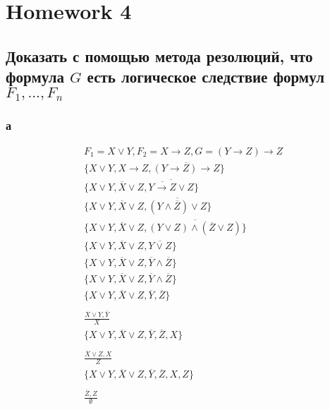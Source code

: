\documentclass[12pt]{article}
\begin{document}
\newpage
\section{Homework 4}

\subsection{Доказать с помощью метода резолюций, что формула $G$ есть логическое следствие формул $F_1,...,F_n$}
\subsubsection{а}
\begin{gather*}
  F_1 = X \vee Y, F_2 = X \rightarrow Z, G = \left( Y \rightarrow Z \right) \rightarrow Z \\
  \{X \vee Y, X \rightarrow Z, \overline{\left( Y \rightarrow Z \right) \rightarrow Z } \} \\
  \{X \vee Y, \overline{X} \vee Z, \overline{  \overline{ Y \rightarrow Z } \vee Z } \} \\
  \{X \vee Y, \overline{X} \vee Z, \overline{ \left( Y \wedge \overline{Z} \right) \vee Z } \} \\
  \{X \vee Y, \overline{X} \vee Z, \overline{ \left( Y \vee Z \right) \wedge \left( \overline{Z} \vee Z \right) } \} \\
  \{X \vee Y, \overline{X} \vee Z, \overline{ Y \vee Z } \} \\
  \{X \vee Y, \overline{X} \vee Z,  \overline{Y} \wedge \overline{Z} \} \\
  \{X \vee Y, \overline{X} \vee Z,  \overline{Y} \wedge \overline{Z} \} \\
  \{X \vee Y, \overline{X} \vee Z,  \overline{Y}, \overline{Z} \} \\
  \\
  \frac{X \vee Y, \overline{Y}}{X} \\
  \{X \vee Y, \overline{X} \vee Z,  \overline{Y}, \overline{Z}, X \} \\
  \\
  \frac{\overline{X} \vee Z, X}{Z} \\
  \{X \vee Y, \overline{X} \vee Z,  \overline{Y}, \overline{Z}, X, Z \} \\
  \\
  \frac{\overline{Z}, Z}{\emptyset} \\
\end{gather*}
\end{document}
